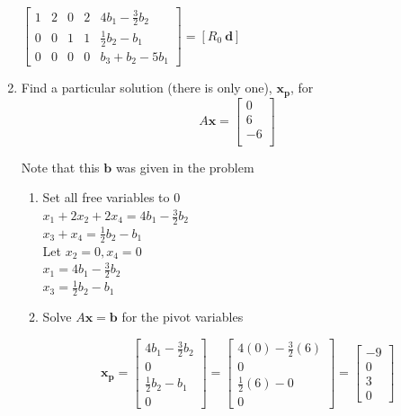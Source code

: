 \documentclass[11pt]{article}
\begin{document}
\begin{enumerate}
    $
    \begin{bmatrix}
        1 & 2 & 0 & 2 & 4b_1 - \frac{3}{2}b_2 \\
        0 & 0 & 1 & 1 & \frac{1}{2}b_2 - b_1 \\
        0 & 0 & 0 & 0 & b_3 + b_2 - 5b_1
    \end{bmatrix} = \left[R_0 \ \boldsymbol{d}\right]
    $

    \item Find a particular solution (there is only one), $\boldsymbol{x_\text{p}}$, for 
    \[ A\boldsymbol{x}= \begin{bmatrix}
        0 \\
        6 \\
        -6 \\
    \end{bmatrix}
    \]

    Note that this $\boldsymbol{b}$ was given in the problem
    \begin{enumerate}
        \item Set all free variables to 0 \\
        $ x_1 + 2x_2 + 2x_4 = 4b_1 - \frac{3}{2}b_2 $ \\
        $ x_3 + x_4 = \frac{1}{2}b_2 - b_1 $ \\

        Let $x_2 = 0, x_4 = 0$ \\
        $x_1 = 4b_1 - \frac{3}{2}b_2 $ \\
        $x_3 = \frac{1}{2}b_2 - b_1$ \\
        
        \item Solve $A\boldsymbol{x} = \boldsymbol{b}$ for the pivot variables
        
        \[ \boldsymbol{x_\text{p}} = \begin{bmatrix}
            4b_1 - \frac{3}{2}b_2 \\
            0 \\
            \frac{1}{2}b_2 - b_1 \\
            0
        \end{bmatrix} = \begin{bmatrix}
            4(0) - \frac{3}{2}(6) \\
            0 \\
            \frac{1}{2}(6) - 0 \\
            0
        \end{bmatrix} = \begin{bmatrix}
            -9 \\
            0 \\
            3 \\
            0
        \end{bmatrix}
    \]
    \end{enumerate}


\end{enumerate}
\end{document}
